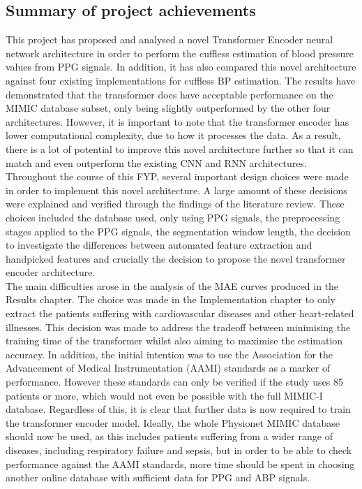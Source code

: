 \subsection{Summary of project achievements}
This project has proposed and analysed a novel Transformer Encoder neural network architecture in order 
to perform the cuffless estimation of blood pressure values from PPG signals. In addition, it has also compared 
this novel architecture against four existing implementations for cuffless BP estimation. The results have 
demonstrated that the transformer does have acceptable performance on the MIMIC database subset, only being slightly outperformed by 
the other four architectures. However, it is important to note that the transformer encoder has lower computational 
complexity, due to how it processes the data. As a result, there is a lot of potential to improve this novel architecture 
further so that it can match and even outperform the existing CNN and RNN architectures.\\ \newline \noindent Throughout the course of this FYP, several important design choices were made in order to implement this novel architecture. 
A large amount of these decisions were explained and verified through the findings of the literature review. These choices included the 
database used, only using PPG signals, the preprocessing stages applied to the PPG signals, the segmentation window length, the decision to investigate the differences between 
automated feature extraction and handpicked features and crucially the decision to propose the novel transformer encoder architecture.\\ \newline \noindent The main difficulties arose in the analysis of the MAE curves produced in the Results chapter. 
The choice was made in the Implementation chapter to only extract the patients suffering 
with cardiovascular diseases and other heart-related illnesses. This decision was made to address 
the tradeoff between minimising the training time of the transformer whilst also aiming to maximise 
the estimation accuracy. In addition, the initial intention was to use the Association for the Advancement of Medical Instrumentation (AAMI) 
standards as a marker of performance. However these standards can only be verified if the study uses 85 patients or more, which would not even be possible with the full MIMIC-I database. Regardless of this, it is clear that further data is now required to train the 
transformer encoder model. Ideally, the whole Physionet MIMIC database should now be used, as 
this includes patients suffering from a wider range of diseases, including respiratory failure and sepsis, but in order to be able to check 
performance against the AAMI standards, more time should be spent in choosing another online database with sufficient data for PPG and ABP signals.

